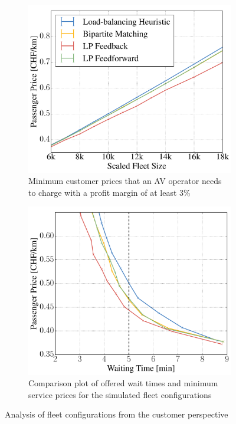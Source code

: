 \begin{figure}
    \centering
    \begin{subfigure}[t]{0.495\textwidth}
        \includegraphics[width=1.0\textwidth]{figures/01_passenger_price.pdf}
        \caption{Minimum customer prices that an AV operator needs to charge with a profit margin of at least 3\%}
        \label{fig:passenger_price}
    \end{subfigure}\hfill
    \begin{subfigure}[t]{0.495\textwidth}
        \includegraphics[width=1.0\textwidth]{figures/time_vs_price.pdf}
        \caption{Comparison plot of offered wait times and minimum service prices for the
        simulated fleet configurations}
        \label{fig:time_vs_price}
    \end{subfigure}
    \caption{Analysis of fleet configurations from the customer perspective}
\end{figure}

